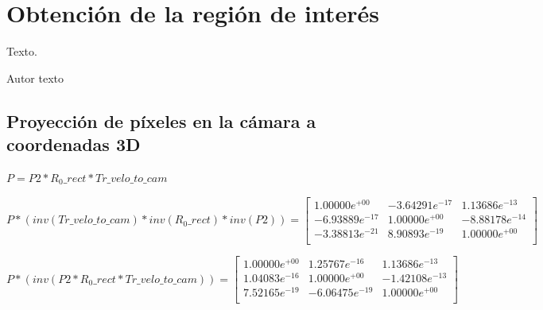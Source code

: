 \chapter{Obtención de la región de interés}
\label{cha:Obtención de la región de interés}

\begin{FraseCelebre}
  \begin{Frase}
    Texto.
  \end{Frase}
  \begin{Fuente}
    Autor texto
  \end{Fuente}
\end{FraseCelebre}

\section{Proyección de píxeles en la cámara a coordenadas 3D}
\label{sec:Proyección de píxeles en la cámara a coordenadas 3D}

\begin{center}
$P = P2 * R_0\_rect * Tr\_velo\_to\_cam$
\end{center}

\begin{center}
$
P * (inv(Tr\_velo\_to\_cam) * inv(R_0\_rect) * inv(P2)) =
\begin{bmatrix}
1.00000e^{+00} & -3.64291e^{-17} & 1.13686e^{-13} \\
-6.93889e^{-17} & 1.00000e^{+00} & -8.88178e^{-14} \\
-3.38813e^{-21} & 8.90893e^{-19} & 1.00000e^{+00} \\
\end{bmatrix}
$
\end{center}

\begin{center}
$
P * (inv(P2 * R_0\_rect * Tr\_velo\_to\_cam)) =
\begin{bmatrix}
1.00000e^{+00} & 1.25767e^{-16} & 1.13686e^{-13} \\
1.04083e^{-16} & 1.00000e^{+00} & -1.42108e^{-13} \\
7.52165e^{-19} & -6.06475e^{-19} & 1.00000e^{+00} \\
\end{bmatrix}
$
\end{center}

